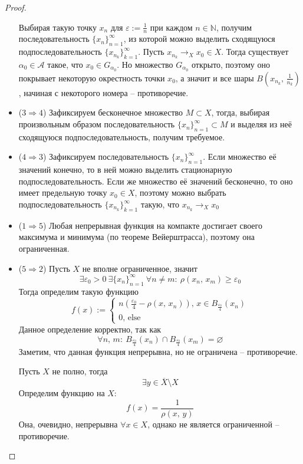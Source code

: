 \documentclass[a4paper,12pt]{article}
\renewcommand{\geq}{\ensuremath{\geqslant}}
\renewcommand{\emptyset}{\ensuremath{\varnothing}}
\theoremstyle{plain}
\theoremstyle{definition}
\theoremstyle{remark}
\begin{document}
\begin{proof}
\begin{itemize}
		      Выбирая такую точку $x_n$ для $\varepsilon := \frac{1}{n}$ при каждом $n \in \mathbb{N}$, получим последовательность $\{x_n\}_{n = 1}^\infty$, из которой можно выделить сходящуюся подпоследовательность $\{x_{n_k}\}_{k = 1}^\infty$. Пусть $x_{n_k} \to_X x_0 \in X$.
		      Тогда существует $\alpha_0 \in \mathcal{A}$ такое, что $x_0 \in G_{\alpha_0}$. Но множество $G_{\alpha_0}$ открыто, поэтому оно покрывает некоторую окрестность точки $x_0$, а значит и все шары $B(x_{n_k},\, \frac{1}{n_k})$, начиная с некоторого номера -- противоречие.
		\item ($3 \Rightarrow 4$) Зафиксируем бесконечное множество $M \subset X$, тогда, выбирая произвольным образом последовательность $\{x_n\}_{n = 1}^\infty \subset M$ и выделяя из неё сходящуюся подпоследовательность, получим требуемое.
		\item ($4 \Rightarrow 3$) Зафиксируем последовательность $\{x_n\}_{n = 1}^\infty$. Если множество её значений конечно, то в ней можно выделить стационарную подпоследовательность. Если же множество её значений бесконечно, то оно имеет предельную точку $x_0 \in X$, поэтому можно выбрать подпоследовательность $\{x_{n_k}\}_{k=1}^\infty$ такую, что $x_{n_k} \to_X x_0$
		\item ($1 \Rightarrow 5$) Любая непрерывная функция на компакте достигает своего максимума и минимума (по теореме Вейерштрасса), поэтому она ограниченная.
		\item ($5 \Rightarrow 2$) Пусть $X$ не вполне ограниченное, значит
		      \[
			      \exists \varepsilon_0 > 0 \: \exists \{x_n\}_{n = 1}^\infty \: \forall n \neq m :\: \rho(x_n,\, x_m) \geq \varepsilon_0
		      \]
		      Тогда определим такую функцию
		      \[
						f(x) := 
			      \begin{cases}
							n(\frac{\varepsilon_0}{4} - \rho(x,\, x_n)),\, x \in B_{\frac{\varepsilon_0}{4}}(x_n)\\
							0,\, \text{else}
			      \end{cases}
		      \]
					Данное определение корректно, так как 
					\[
						\forall n,\, m :\: B_{\frac{\varepsilon_0}{4}}(x_n) \cap B_{\frac{\varepsilon_0}{4}}(x_m) = \emptyset
					\]
					Заметим, что данная функция непрерывна, но не ограничена -- противоречие.

					Пусть $X$ не полно, тогда
					\[
						\exists y \in \overline{X} \setminus X
					\]
					Определим функцию на $X$:
					\[
						f(x) = \frac{1}{\rho(x,\, y)}
					\]
					Она, очевидно, непрерывна $\forall x \in X$, однако не является ограниченной -- противоречие.
	\end{itemize}
\end{proof}
\end{document}
